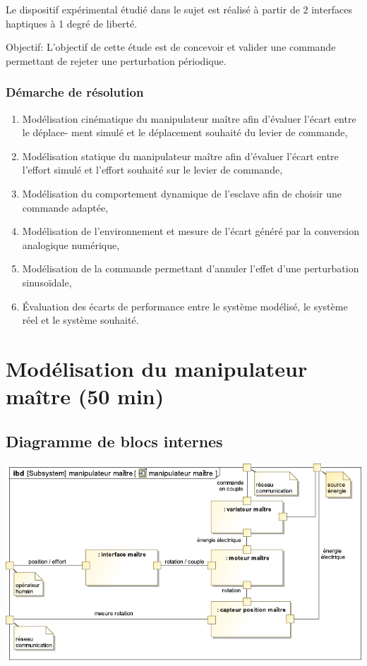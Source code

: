 Le dispositif expérimental étudié dans le sujet est réalisé à partir de 2 interfaces haptiques à 1 degré de liberté.

Objectif: L'objectif de cette étude est de concevoir et valider une commande permettant de rejeter une perturbation périodique.

\subsubsection{Démarche de résolution}

\begin{enumerate}
 \item Modélisation cinématique du manipulateur maître afin d'évaluer l'écart entre le déplace- ment simulé et le déplacement souhaité du levier de commande,
 \item Modélisation statique du manipulateur maître afin d'évaluer l'écart entre l'effort simulé et l'effort souhaité sur le levier de commande,
 \item Modélisation du comportement dynamique de l'esclave afin de choisir une commande adaptée,
 \item Modélisation de l'environnement et mesure de l'écart généré par la conversion analogique numérique,
 \item Modélisation de la commande permettant d'annuler l'effet d'une perturbation sinusoïdale,
 \item Évaluation des écarts de performance entre le système modélisé, le système réel et  le
système souhaité.
\end{enumerate}

\section{Modélisation  du  manipulateur maître (50 min)}

\subsection{Diagramme de blocs internes}

\begin{center}
 \includegraphics[width=0.9\linewidth]{img/Figure3}
\end{center}

